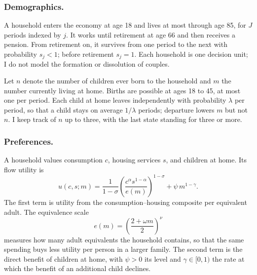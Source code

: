 \subsubsection*{Demographics.}
A household enters the economy at age 18 and lives at most through age 85, for
$J$ periods indexed by $j$. It works until retirement at age 66 and then
receives a pension. From retirement on, it survives from one period to the
next with probability $s_j<1$; before retirement $s_j=1$.
Each household is one decision unit; I do not model the formation or
dissolution of couples.

Let $n$ denote the number of children ever born to the household and $m$ the
number currently living at home. Births are possible at ages 18 to 45, at most
one per period. Each child at home leaves independently with probability
$\lambda$ per period, so that a child stays on average $1/\lambda$ periods;
departure lowers $m$ but not $n$. I keep track of $n$ up to three, with the
last state standing for three or more.

\subsubsection*{Preferences.}
A household values consumption $c$, housing services $s$, and children at
home. Its flow utility is
\begin{equation}
 u(c,s;m)
 =\frac{1}{1-\sigma}\left(\frac{c^{\alpha}s^{1-\alpha}}{e(m)}\right)^{1-\sigma}
 +\psi\, m^{1-\gamma}.
 \label{eq:m5-utility}
\end{equation}
The first term is utility from the consumption--housing composite per
equivalent adult. The equivalence scale
\begin{equation}
 e(m)=\left(\frac{2+\omega m}{2}\right)^{\nu}
 \label{eq:m5-escale}
\end{equation}
measures how many adult equivalents the household contains, so that the same
spending buys less utility per person in a larger family. The second term is
the direct benefit of children at home, with $\psi>0$ its level and
$\gamma\in[0,1)$ the rate at which the benefit of an additional child
declines.

